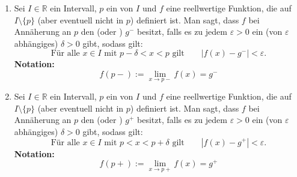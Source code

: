 \begin{enumerate}[leftmargin=*]
    \item Sei $I \in \mathbb{R}$ ein Intervall, $p$ ein  von $I$ und $f$ eine reellwertige Funktion, die auf $I \setminus \{p\}$ (aber eventuell nicht in $p$) definiert ist. Man sagt, dass $f$ bei Annäherung an $p$
    den  (oder ) $g^-$ besitzt, falls es zu jedem $\varepsilon > 0$ ein (von $\varepsilon$ abhängiges) $\delta > 0$ gibt, sodass gilt:
    $$\text{Für alle $x \in I$ mit $p - \delta < x < p$ gilt} \qquad | f (x) - g^- | < \varepsilon.$$
    \textbf{Notation:}
    $$f(p-) := \lim_{x \to p-} f(x) = g^-$$
    \item Sei $I \in \mathbb{R}$ ein Intervall, $p$ ein  von $I$ und $f$ eine reellwertige Funktion, die auf $I \setminus \{p\}$ (aber eventuell nicht in $p$) definiert ist. Man sagt, dass $f$ bei Annäherung an $p$
    den  (oder ) $g^+$ besitzt, falls es zu jedem $\varepsilon > 0$ ein (von $\varepsilon$ abhängiges) $\delta > 0$ gibt, sodass gilt:
    $$\text{Für alle $x \in I$ mit $p < x < p + \delta$ gilt} \qquad | f (x) - g^+ | < \varepsilon.$$
    \textbf{Notation:}
    $$f(p+) := \lim_{x \to p+} f(x) = g^+$$ 
\end{enumerate}